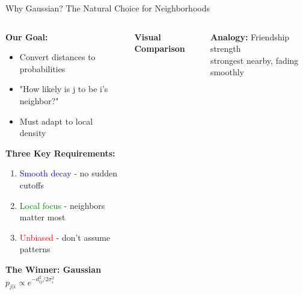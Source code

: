\documentclass[aspectratio=169]{beamer}
\begin{document}
\begin{frame}{Why Gaussian? The Natural Choice for Neighborhoods}
\begin{columns}
\begin{tcolorbox}[colback=blue!5, colframe=blue!40, title={\textbf{What We're Building}}]
\textbf{Our Goal:}
\begin{itemize}
\item Convert distances to probabilities
\item "How likely is j to be i's neighbor?"
\item Must adapt to local density
\end{itemize}

\vspace{3mm}
\textbf{Three Key Requirements:}
\begin{enumerate}
\item \textcolor{blue}{Smooth decay} - no sudden cutoffs
\item \textcolor{green}{Local focus} - neighbors matter most
\item \textcolor{red}{Unbiased} - don't assume patterns
\end{enumerate}

\vspace{3mm}
\textbf{The Winner: Gaussian}
\vspace{-2mm}
$p_{j|i} \propto e^{-d_{ij}^2/2\sigma_i^2}$
\end{tcolorbox}

\begin{center}
\textbf{Visual Comparison}\\[3mm]
\end{center}

\vspace{3mm}
\begin{tcolorbox}[colback=green!5, colframe=green!40, boxrule=0.5pt]
\centering\small
\textbf{Analogy:} Friendship strength\\
strongest nearby, fading smoothly
\end{tcolorbox}
\end{columns}
\end{frame}
\end{document}
